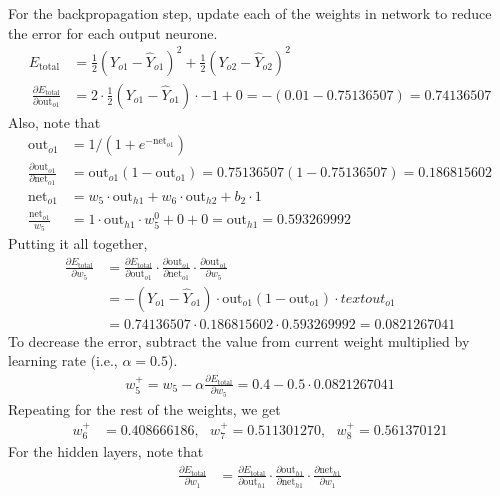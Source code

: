 \begin{example}
For the backpropagation step, update each of the weights in network to reduce the error for each output neurone.
\begin{align}
E_{\text{total}} &= \frac{1}{2}(Y_{o1} - \hat{Y}_{o1})^2 + \frac{1}{2}(Y_{o2} - \hat{Y}_{o2})^2 \nonumber \\\
\frac{\partial E_{\text{total}}}{\partial \text{out}_{o1}} &= 2 \cdot \frac{1}{2}(Y_{o1} - \hat{Y}_{o1}) \cdot -1 + 0 = - (0.01 - 0.75136507) = 0.74136507 \nonumber
\end{align}
Also, note that
\begin{align}
\text{out}_{o1} &= 1/(1 + e^{-\text{net}_{o1}}) \nonumber \\
\frac{\partial\text{out}_{o1}}{\partial\text{net}_{o1}} &= \text{out}_{o1} (1 - \text{out}_{o1}) = 0.75136507(1-0.75136507) = 0.186815602 \nonumber \\
\text{net}_{o1} &= w_5 \cdot \text{out}_{h1} + w_6 \cdot \text{out}_{h2} + b_2 \cdot 1 \nonumber \\
\frac{\text{net}_{o1}}{w_5} &= 1 \cdot \text{out}_{h1} \cdot w_5^{0} + 0 + 0 = \text{out}_{h1} = 0.593269992 \nonumber
\end{align}
Putting it all together,
\begin{align}
\frac{\partial E_{\text{total}}}{\partial w_5} &= \frac{\partial E_{\text{total}}}{\partial \text{out}_{o1}} \cdot \frac{\partial \text{out}_{o1}}{ \partial \text{net}_{o1}} \cdot \frac{\partial \text{out}_{o1}}{\partial w_5} \nonumber \\
&= - (Y_{o1} - \hat{Y}_{o1}) \cdot \text{out}_{o1} (1 - \text{out}_{o1}) \cdot text{out}_{o1} \nonumber \\
&= 0.74136507 \cdot 0.186815602 \cdot 0.593269992 = 0.0821267041 \nonumber
\end{align}
To decrease the error, subtract the value from current weight multiplied by learning rate (i.e., $\alpha = 0.5$).
\begin{align}
w_5^+ = w_5 - \alpha \frac{\partial E_{\text{total}}}{\partial w_5} = 0.4 - 0.5 \cdot 0.0821267041 \nonumber 
\end{align}
Repeating for the rest of the weights, we get
\begin{align}
w_6^+ &= 0.408666186, \ \ \ w_7^+ = 0.511301270, \ \ \ w_8^+ = 0.561370121 \nonumber
\end{align}
For the hidden layers, note that
\begin{align}
\frac{\partial E_{\text{total}}}{\partial w_1} &= \frac{\partial E_{\text{total}}}{\partial \text{out}_{h1}} \cdot \frac{\partial \text{out}_{h1}}{\partial \text{net}_{h1}} \cdot \frac{\partial \text{net}_{h1}}{\partial w_1} \nonumber \\

\end{align}
\end{example}
